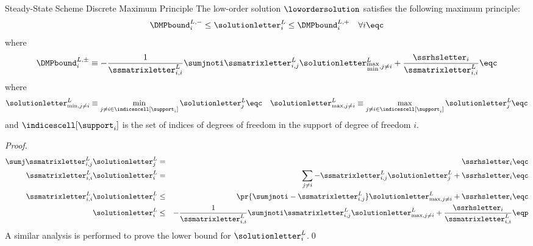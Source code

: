\begin{theorem}{Steady-State Scheme Discrete Maximum Principle}
The low-order solution $\lowordersolution$ satisfies the following maximum
principle:
\begin{equation}\label{eq:DMP_ss}
   \DMPbound_i^{L,-} \leq \solutionletter_i^L
     \leq \DMPbound_i^{L,+}\quad\forall i \eqc
\end{equation}
where
\begin{equation}
   \DMPbound_i^{L,\pm} \equiv -\frac{1}{\ssmatrixletter^L_{i,i}}
      \sumjnoti\ssmatrixletter^L_{i,j}
      \solutionletter_{\substack{\max\\\min},j\ne i}^L
      + \frac{\ssrhsletter_i}{\ssmatrixletter^L_{i,i}} \eqc
\end{equation}
where
\[
  \solutionletter_{\min,j\ne i}^L \equiv \min\limits_{j\ne i\in\indicescell[\support_i]}
    \solutionletter_j^L
  \eqc\quad
  \solutionletter_{\max,j\ne i}^L \equiv \max\limits_{j\ne i\in\indicescell[\support_i]}
    \solutionletter_j^L
  \eqc
\]
and $\indicescell[\support_i]$ is the set of indices of degrees of freedom in
the support of degree of freedom $i$.
\end{theorem}

\begin{proof}
\begin{eqnarray*}
  \sumj\ssmatrixletter^L_{i,j}\solutionletter_j^L & = & \ssrhsletter_i\eqc\\
  \ssmatrixletter^L_{i,i}\solutionletter_i^L      & = & \sum\limits_{j\ne i}
    - \ssmatrixletter^L_{i,j}\solutionletter_j^L + \ssrhsletter_i\eqc\\
  \ssmatrixletter^L_{i,i}\solutionletter_i^L      & \le &
    \pr{\sumjnoti -\ssmatrixletter^L_{i,j}}\solutionletter_{\max,j\ne i}^L
    + \ssrhsletter_i\eqc\\
  \solutionletter_i^L & \le & -\frac{1}{\ssmatrixletter^L_{i,i}}
    \sumjnoti\ssmatrixletter^L_{i,j}\solutionletter_{\max,j\ne i}^L
    + \frac{\ssrhsletter_i}{\ssmatrixletter^L_{i,i}} \eqp
\end{eqnarray*}
A similar analysis is performed to prove the lower bound for
$\solutionletter_i^L$.\qed
\end{proof}
